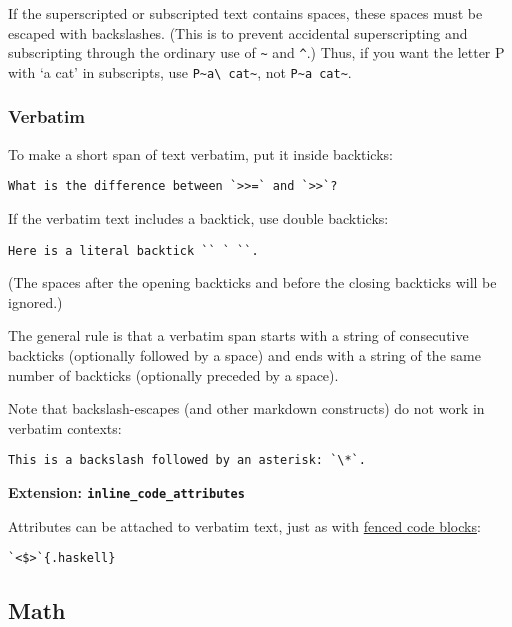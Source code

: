 \documentclass[]{article}
\begin{document}
If the superscripted or subscripted text contains spaces, these spaces
must be escaped with backslashes. (This is to prevent accidental
superscripting and subscripting through the ordinary use of
\texttt{\textasciitilde{}} and \texttt{\^{}}.) Thus, if you want the
letter P with `a cat' in subscripts, use
\texttt{P\textasciitilde{}a\textbackslash{} cat\textasciitilde{}}, not
\texttt{P\textasciitilde{}a cat\textasciitilde{}}.

\subsubsection{Verbatim}\label{verbatim}

To make a short span of text verbatim, put it inside backticks:

\begin{verbatim}
What is the difference between `>>=` and `>>`?
\end{verbatim}

If the verbatim text includes a backtick, use double backticks:

\begin{verbatim}
Here is a literal backtick `` ` ``.
\end{verbatim}

(The spaces after the opening backticks and before the closing backticks
will be ignored.)

The general rule is that a verbatim span starts with a string of
consecutive backticks (optionally followed by a space) and ends with a
string of the same number of backticks (optionally preceded by a space).

Note that backslash-escapes (and other markdown constructs) do not work
in verbatim contexts:

\begin{verbatim}
This is a backslash followed by an asterisk: `\*`.
\end{verbatim}

\textbf{Extension: \texttt{inline\_code\_attributes}}

Attributes can be attached to verbatim text, just as with
\hyperref[fenced-code-blocks]{fenced code blocks}:

\begin{verbatim}
`<$>`{.haskell}
\end{verbatim}

\subsection{Math}\label{math-1}
\end{document}
